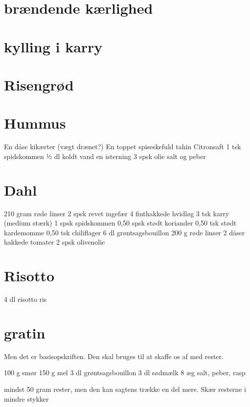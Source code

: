 \documentclass[
]{book}
\begin{document}
\section{brændende kærlighed}\label{bruxe6ndende-kuxe6rlighed}

\section{kylling i karry}\label{kylling-i-karry}

\section{Risengrød}\label{risengruxf8d}

\section{Hummus}\label{hummus}

En dåse kikærter (vægt drænet?)
En toppet spiseskefuld tahin
Citronsaft
1 tsk spidskommen
½ dl koldt vand
en isterning
3 spsk olie
salt og peber

\section{Dahl}\label{dahl}

210 gram røde linser
2 spsk revet ingefær
4 finthakkede hvidløg
3 tsk karry (medium stærk)
1 spsk spidskommen
0,50 spsk stødt koriander
0,50 tsk stødt kardemomme
0,50 tsk chiliflager
6 dl grøntsagsbouillon
200 g røde linser
2 dåser hakkede tomater
2 spsk olivenolie

\section{Risotto}\label{risotto}

4 dl risotto ris

\section{gratin}\label{gratin-1}

Men det er basisopskriften. Den skal bruges til at skaffe os af med rester.

100 g smør
150 g mel
3 dl grøntsagsbouillon
3 dl sødmælk
8 æg
salt, peber, rasp

mindst 50 gram rester, men den kan sagtens trække en del mere.
Skær resterne i mindre stykker
\end{document}
